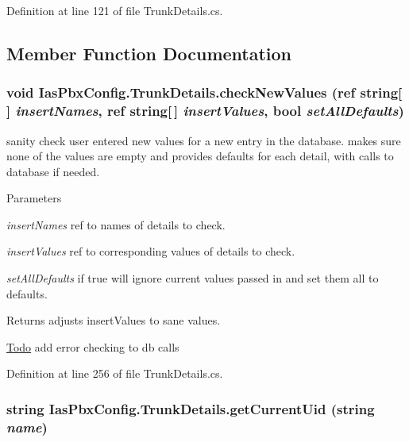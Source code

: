Definition at line 121 of file TrunkDetails.cs.

\subsection{Member Function Documentation}
\hypertarget{class_ias_pbx_config_1_1_trunk_details_acdc7d06a5f58918faabd4057300585d3}{
\subsubsection[{checkNewValues}]{\setlength{\rightskip}{0pt plus 5cm}void IasPbxConfig.TrunkDetails.checkNewValues (ref string\mbox{[}$\,$\mbox{]} {\em insertNames}, \/  ref string\mbox{[}$\,$\mbox{]} {\em insertValues}, \/  bool {\em setAllDefaults})}}
\label{class_ias_pbx_config_1_1_trunk_details_acdc7d06a5f58918faabd4057300585d3}


sanity check user entered new values for a new entry in the database. makes sure none of the values are empty and provides defaults for each detail, with calls to database if needed. 
\begin{DoxyParams}{Parameters}
\item[{\em insertNames}]ref to names of details to check. \item[{\em insertValues}]ref to corresponding values of details to check. \item[{\em setAllDefaults}]if true will ignore current values passed in and set them all to defaults. \end{DoxyParams}
\begin{DoxyReturn}{Returns}
adjusts insertValues to sane values. 
\end{DoxyReturn}
\begin{Desc}
\item[\hyperlink{todo__todo000048}{Todo}]add error checking to db calls \end{Desc}


Definition at line 256 of file TrunkDetails.cs.\hypertarget{class_ias_pbx_config_1_1_trunk_details_adbb8e5a6091b5a602227d4571fab3a06}{
\subsubsection[{getCurrentUid}]{\setlength{\rightskip}{0pt plus 5cm}string IasPbxConfig.TrunkDetails.getCurrentUid (string {\em name})}}
\label{class_ias_pbx_config_1_1_trunk_details_adbb8e5a6091b5a602227d4571fab3a06}


